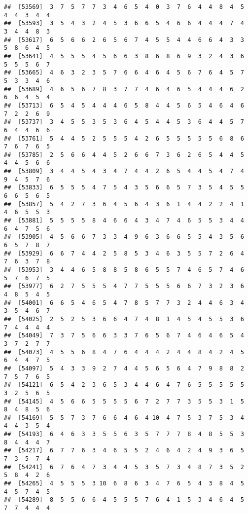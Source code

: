 \documentclass[
]{book}
\begin{document}
\begin{verbatim}
##  [53569]  3  7  5  7  7  3  4  6  5  4  0  3  7  6  4  4  8  4  5  4  4  3  4  4
##  [53593]  3  5  4  3  2  4  5  3  6  6  5  4  6  6  4  4  4  7  4  3  4  4  8  3
##  [53617]  6  5  6  6  2  6  5  6  7  4  5  5  4  4  6  6  4  3  3  5  8  6  4  5
##  [53641]  4  5  5  5  4  5  6  6  3  8  6  8  6  9  3  2  4  3  6  5  5  5  6  7
##  [53665]  4  6  3  2  3  5  7  6  6  4  6  4  5  6  7  6  4  5  7  5  3  3  4  6
##  [53689]  4  6  5  6  7  8  3  7  7  4  6  4  6  5  4  4  4  6  2  6  6  4  5  4
##  [53713]  6  5  4  5  4  4  4  6  5  8  4  4  5  6  5  4  6  4  6  7  2  2  6  9
##  [53737]  3  4  5  5  3  5  3  6  4  5  4  4  5  3  6  4  4  5  7  6  4  4  6  6
##  [53761]  5  4  4  5  2  5  5  5  4  2  6  5  5  5  5  5  6  8  6  7  6  7  6  5
##  [53785]  2  5  6  6  4  4  5  2  6  6  7  3  6  2  6  5  4  4  5  4  4  5  6  6
##  [53809]  3  4  4  5  4  3  4  7  4  4  2  6  5  4  4  5  4  7  4  9  4  5  7  6
##  [53833]  6  5  5  5  4  7  5  4  3  5  6  6  5  7  3  5  4  5  5  6  6  5  6  5
##  [53857]  5  4  2  7  3  6  4  5  6  4  3  6  1  4  4  2  2  4  1  4  6  5  5  3
##  [53881]  5  5  5  5  8  4  6  6  4  3  4  7  4  6  5  5  3  4  4  6  4  7  5  6
##  [53905]  4  5  6  6  7  3  3  4  9  6  3  6  6  5  5  4  3  5  6  6  5  7  8  7
##  [53929]  6  6  7  4  4  2  5  8  5  3  4  6  3  5  5  7  2  6  4  7  6  3  7  8
##  [53953]  3  4  4  6  5  8  8  5  8  6  5  5  7  4  6  5  7  4  6  5  7  6  7  5
##  [53977]  6  2  7  5  5  5  4  7  7  5  5  5  6  6  7  3  2  3  6  4  8  5  4  5
##  [54001]  6  6  5  4  6  5  4  7  8  5  7  7  3  2  4  4  6  3  4  3  5  4  6  7
##  [54025]  2  5  2  5  3  6  6  4  7  4  8  1  4  5  4  5  5  3  6  7  4  4  4  4
##  [54049]  7  3  7  5  6  6  3  3  7  6  5  6  7  4  6  4  6  5  4  3  7  2  7  7
##  [54073]  4  5  5  6  8  4  7  6  4  4  4  2  4  4  8  4  2  4  5  6  4  4  7  5
##  [54097]  5  4  3  3  9  2  7  4  4  5  6  5  6  4  7  9  8  8  2  7  5  7  6  5
##  [54121]  6  5  4  2  3  6  5  3  4  4  6  4  7  6  5  5  5  5  5  3  2  5  6  5
##  [54145]  4  5  6  6  5  5  5  5  6  7  2  7  7  3  5  5  3  1  5  8  4  8  5  6
##  [54169]  5  5  7  3  7  6  6  4  6  4 10  4  7  5  3  7  5  3  4  4  4  3  5  4
##  [54193]  6  4  6  3  3  5  5  6  3  5  7  7  7  8  4  8  5  5  3  8  4  4  4  7
##  [54217]  6  7  7  6  3  4  6  5  5  2  4  6  4  2  4  9  3  6  5  7  3  5  7  4
##  [54241]  6  7  6  4  7  3  4  4  5  3  5  7  3  4  8  7  3  5  2  5  8  4  2  6
##  [54265]  4  5  5  5  3 10  6  8  6  3  4  7  6  5  4  3  8  4  5  4  5  7  4  5
##  [54289]  8  5  5  6  6  4  5  5  5  7  6  4  1  5  3  4  6  4  5  7  7  4  4  4

\end{verbatim}
\end{document}
